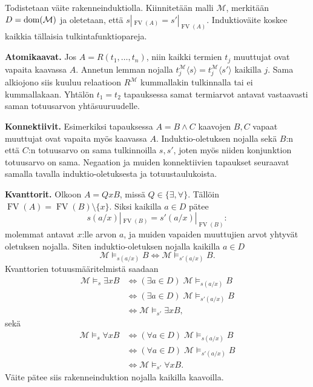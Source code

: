 \documentclass[11pt,a4paper]{amsart}
\begin{document}
\begin{solution}
  Todistetaan väite rakenneinduktiolla. Kiinnitetään malli \(\mathcal M\),
  merkitään \(D=\operatorname{dom}(\mathcal M)\) ja oletetaan, että
  \(s|_{\operatorname{FV}(A)}=s'|_{\operatorname{FV}(A)}\).
  Induktioväite koskee kaikkia tällaisia tulkintafunktiopareja.

  \textbf{Atomikaavat.} Jos \(A=R(t_1,\ldots,t_n)\), niin kaikki termien
  \(t_j\) muuttujat ovat vapaita kaavassa \(A\). Annetun lemman nojalla
  \(t_j^{\mathcal M}\langle s\rangle=t_j^{\mathcal M}\langle s'\rangle\)
  kaikilla \(j\). Sama alkiojono siis kuuluu relaatioon
  \(R^{\mathcal M}\) kummallakin tulkinnalla tai ei kummallakaan.
  Yhtälön \(t_1=t_2\) tapauksessa samat termiarvot antavat vastaavasti
  saman totuusarvon yhtäsuuruudelle.

  \textbf{Konnektiivit.} Esimerkiksi tapauksessa \(A=B\land C\)
  kaavojen \(B,C\) vapaat muuttujat ovat vapaita myös kaavassa \(A\).
  Induktio-oletuksen nojalla sekä \(B\):n että \(C\):n totuusarvo on
  sama tulkinnoilla \(s,s'\), joten myös niiden konjunktion totuusarvo
  on sama. Negaation ja muiden konnektiivien tapaukset seuraavat
  samalla tavalla induktio-oletuksesta ja totuustaulukoista.

  \textbf{Kvanttorit.} Olkoon \(A=QxB\), missä
  \(Q\in\{\exists,\forall\}\). Tällöin
  \(\operatorname{FV}(A)=\operatorname{FV}(B)\setminus\{x\}\).
  Siksi kaikilla \(a\in D\) pätee
  \[
    s(a/x)|_{\operatorname{FV}(B)}
    =s'(a/x)|_{\operatorname{FV}(B)}:
  \]
  molemmat antavat \(x\):lle arvon \(a\), ja muiden vapaiden muuttujien
  arvot yhtyvät oletuksen nojalla.
  Siten induktio-oletuksen nojalla kaikilla \(a\in D\)
  \[
    \mathcal M\models_{s(a/x)}B
    \iff\mathcal M\models_{s'(a/x)}B.
  \]
  Kvanttorien totuusmääritelmistä saadaan
  \[
    \begin{aligned}
      \mathcal M\models_s\exists xB
      &\iff (\exists a\in D)\;\mathcal M\models_{s(a/x)}B \\
      &\iff (\exists a\in D)\;\mathcal M\models_{s'(a/x)}B \\
      &\iff\mathcal M\models_{s'}\exists xB,
    \end{aligned}
  \]
  sekä
  \[
    \begin{aligned}
      \mathcal M\models_s\forall xB
      &\iff (\forall a\in D)\;\mathcal M\models_{s(a/x)}B \\
      &\iff (\forall a\in D)\;\mathcal M\models_{s'(a/x)}B \\
      &\iff\mathcal M\models_{s'}\forall xB.
    \end{aligned}
  \]
  Väite pätee siis rakenneinduktion nojalla kaikilla kaavoilla.\qedhere
\end{solution}
\end{document}
